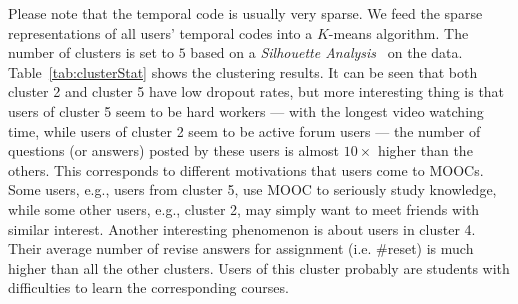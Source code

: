     Please note that the temporal code is usually very sparse. We feed the sparse representations of all users' temporal codes into a $K$-means algorithm.
    The number of clusters is set to $5$ based on a \textit{Silhouette Analysis}~\cite{rousseeuw1987silhouettes} on the data. 
    Table~\ref{tab:clusterStat} shows the clustering results. It can be  seen that 
    both cluster 2 and cluster 5 have low dropout rates, but more interesting thing is that users of cluster 5 seem to be hard workers --- with the longest video watching time, while users of cluster 2 seem to be active forum users --- the number of questions (or answers) posted by these users is almost $10\times$ higher than the others. This corresponds to different motivations that users come to MOOCs. Some users, e.g., users from cluster 5, use MOOC to seriously study knowledge, while some other users, e.g., cluster 2, may simply want to meet friends with similar interest.
    Another interesting phenomenon is about users in cluster 4. Their average number of revise answers for assignment (i.e.  \#reset) is much higher than all the other clusters.
    Users of this cluster probably are students with difficulties to learn the corresponding courses.
    
